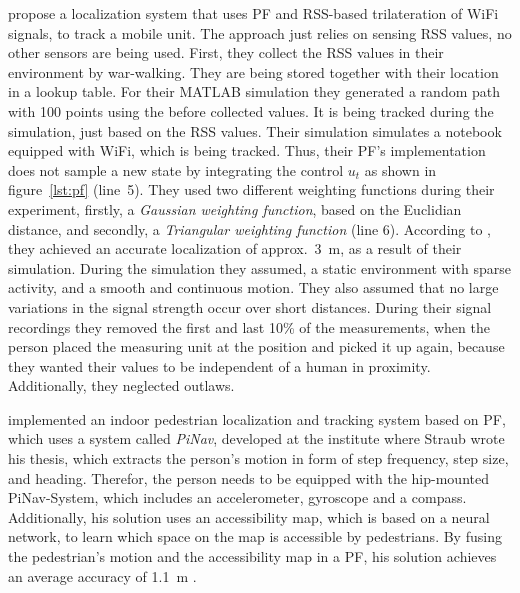 \citet{Siddiqui:tracking} propose a localization system that uses \acs{PF} and \acs{RSS}-based trilateration of WiFi signals, to track a mobile unit. The approach just relies on sensing \acs{RSS} values, no other sensors are being used. First, they collect the \acs{RSS} values in their environment by war-walking. They are being stored together with their location in a lookup table. For their MATLAB simulation they generated a random path with 100 points using the before collected values. It is being tracked during the simulation, just based on the \acs{RSS} values. Their simulation simulates a notebook equipped with WiFi, which is being tracked. Thus, their \acs{PF}'s implementation does not sample a new state by integrating the control $u_t$ as shown in figure~\ref{lst:pf} (line~5). They used two different weighting functions during their experiment, firstly, a \emph{Gaussian weighting function}, based on the Euclidian distance, and secondly, a \emph{Triangular weighting function} (line 6). According to \citet{Siddiqui:tracking}, they achieved an accurate localization of approx.\ 3~m, as a result of their simulation. During the simulation they assumed, a static environment with sparse activity, and a smooth and continuous motion. They also assumed that no large variations in the signal strength occur over short distances. During their signal recordings they removed the first and last 10\% of the measurements, when the person placed the measuring unit at the position and picked it up again, because they wanted their values to be independent of a human in proximity. Additionally, they neglected outlaws.

\citet{straub:pf} implemented an indoor pedestrian localization and tracking system based on \acs{PF}, which uses a system called \emph{PiNav}, developed at the institute where Straub wrote his thesis, which extracts the person's motion in form of step frequency, step size, and heading. Therefor, the person needs to be equipped with the hip-mounted PiNav-System, which includes an accelerometer, gyroscope and a compass. Additionally, his solution uses an accessibility map, which is based on a neural network, to learn which space on the map is accessible by pedestrians. By fusing the pedestrian's motion and the accessibility map in a \acs{PF}, his solution achieves an average accuracy of 1.1~m \citep{straub:pf}.

